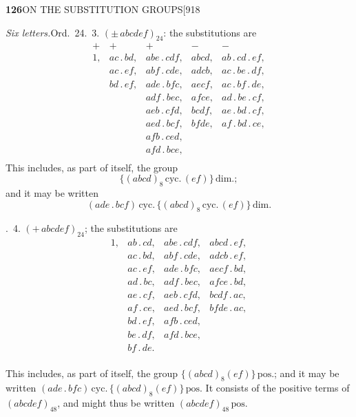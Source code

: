 \documentclass[11pt]{article}
\begin{document}
\newpage
\noindent\textbf{126}\hfill ON THE SUBSTITUTION GROUPS\hfill[918

\smallskip
\noindent\textit{Six letters.}\hspace{2em}Ord.\ 24.~3. $(\pm\,abcdef)_{24}$:
the substitutions are
\[
\begin{array}{lllll}
+ & + & + & - & -\\
1, & ac\,.\,bd, & abe\,.\,cdf, & abcd, & ab\,.\,cd\,.\,ef,\\
   & ac\,.\,ef, & abf\,.\,cde, & adcb, & ac\,.\,be\,.\,df,\\
   & bd\,.\,ef, & ade\,.\,bfc, & aecf, & ac\,.\,bf\,.\,de,\\
   &            & adf\,.\,bec, & afce, & ad\,.\,be\,.\,cf,\\
   &            & aeb\,.\,cfd, & bcdf, & ae\,.\,bd\,.\,cf,\\
   &            & aed\,.\,bcf, & bfde, & af\,.\,bd\,.\,ce,\\
   &            & afb\,.\,ced, &       & \\
   &            & afd\,.\,bce, &       & \\
\end{array}
\]
This includes, as part of itself, the group
\[
\{(abcd)_{8}\,\text{cyc.}\,(ef)\}\,\text{dim.};
\]
and it may be written
\[
(ade\,.\,bcf)\,\text{cyc.}\,\{(abcd)_{8}\,\text{cyc.}\,(ef)\}\,\text{dim.}
\]

\smallskip
{}.~4. $(+\,abcdef)_{24}$; the substitutions are
\[
\begin{array}{lllll}
1, & ab\,.\,cd, & abe\,.\,cdf, & abcd\,.\,ef,\\
   & ac\,.\,bd, & abf\,.\,cde, & adcb\,.\,ef,\\
   & ac\,.\,ef, & ade\,.\,bfc, & aecf\,.\,bd,\\
   & ad\,.\,bc, & adf\,.\,bec, & afce\,.\,bd,\\
   & ae\,.\,cf, & aeb\,.\,cfd, & bcdf\,.\,ac,\\
   & af\,.\,ce, & aed\,.\,bcf, & bfde\,.\,ac,\\
   & bd\,.\,ef, & afb\,.\,ced, & \\
   & be\,.\,df, & afd\,.\,bce, & \\
   & bf\,.\,de. & & \\
\end{array}
\]

\hspace{1em} This includes, as part of itself, the group
$\{(abcd)_{8}(ef)\}\,\text{pos.}$; and it may be written
$(ade\,.\,bfc)\,\text{cyc.}\,\{(abcd)_{8}(ef)\}\,\text{pos.}$ It consists of
the positive terms of $(abcdef)_{48}$, and might thus be written
$(abcdef)_{48}\,\text{pos.}$
\end{document}
